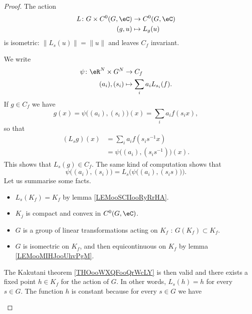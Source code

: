 \begin{proof}
	The action
	\begin{equation}
		\begin{aligned}
			L\colon G\times C^0(G,\eC) & \to C^0(G,\eC) \\
			(g,u)                      & \mapsto L_g(u)
		\end{aligned}
	\end{equation}
	is isometric: \( \| L_s(u) \|=\| u \|\) and leaves \( C_f\) invariant.
	\begin{subproof}
		\spitem[\( L_s(C_f)\subset C_f\)]
		We write
		\begin{equation}
			\begin{aligned}
				\psi\colon \eR^N\times G^N & \to C_f                      \\
				(a_i), (s_i)               & \mapsto \sum_ia_iL_{s_i}(f).
			\end{aligned}
		\end{equation}
		If \( g\in C_f\) we have
		\begin{equation}
			g(x)=\psi\big( (a_i), (s_i) \big)(x)=\sum_ia_if(s_ix),
		\end{equation}
		so that
		\begin{subequations}
			\begin{align}
				(L_sg)(x) & =\sum_ia_if(s_is^{-1}x)                \\
				          & =\psi\big( (a_i),(s_is^{-1}) \big)(x).
			\end{align}
		\end{subequations}
		This shows that \( L_s(g)\in C_f\).
		\spitem[\(C_f\subset L_s( C_f)\)]
		The same kind of computation shows that
		\begin{equation}
			\psi\big( (a_i),(s_i) \big)=L_s\Big( \psi\big( (a_i), (s_is) \big) \Big).
		\end{equation}
		\spitem[Kakutani]
		Let us summarise some facts.
		\begin{itemize}
			\item
			      \( L_s(K_f)=K_f\) by lemma \ref{LEMooSCIIooRyRrHA}.
			\item
			      \( K_j\) is compact and convex in \( C^0(G,\eC)\).
			\item
			      \( G\) is a group of linear transformations acting on \( K_f\) : \( G(K_f)\subset K_f\).
			\item
			      \( G\) is isomectric on \( K_f\), and then equicontinuous on \( K_f\) by lemma \ref{LEMooMIHJooUhvPgM}.
		\end{itemize}
		The Kakutani theorem \ref{THOooWXQFooQrWcLY} is then valid and there exists a fixed point \( h\in K_f\) for the action of \( G\). In other words, \( L_s(h)=h\) for every \( s\in G\). The function \( h\) is constant because for every \( s\in G\) we have

\end{subproof}
\end{proof}
